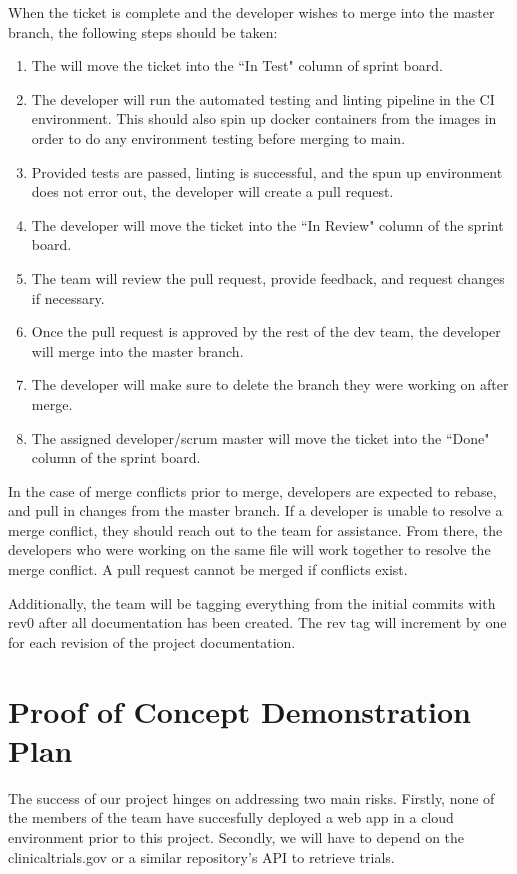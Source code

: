 \documentclass{article}
\begin{document}
When the ticket is complete and the developer wishes to merge into the master branch, the following steps should be taken:
\begin{enumerate}
	\item The will move the ticket into the ``In Test" column of sprint board.
	\item The developer will run the automated testing and linting pipeline in the CI environment.
	This should also spin up docker containers from the images in order to do any environment testing before merging to main.
	\item Provided tests are passed, linting is successful, and the spun up environment does not error out, the developer will create a pull request.
	\item The developer will move the ticket into the ``In Review" column of the sprint board.
	\item The team will review the pull request, provide feedback, and request changes if necessary. 
	\item Once the pull request is approved by the rest of the dev team, the developer will merge into the master branch.
	\item The developer will make sure to delete the branch they were working on after merge.
	\item The assigned developer/scrum master will move the ticket into the ``Done" column of the sprint board.
\end{enumerate}

In the case of merge conflicts prior to merge, developers are expected to rebase, and pull in changes from the master branch.
If a developer is unable to resolve a merge conflict, they should reach out to the team for assistance. 
From there, the developers who were working on the same file will work together to resolve the merge conflict. 
A pull request cannot be merged if conflicts exist.

Additionally, the team will be tagging everything from the initial commits with rev0 after all documentation has been created. 
The rev tag will increment by one for each revision of the project documentation.

\section{Proof of Concept Demonstration Plan}

The success of our project hinges on addressing two main risks.
Firstly, none of the members of the team have succesfully deployed a web app in a cloud environment prior to this project. 
Secondly, we will have to depend on the clinicaltrials.gov or a similar repository's API to retrieve trials. 
\end{document}
